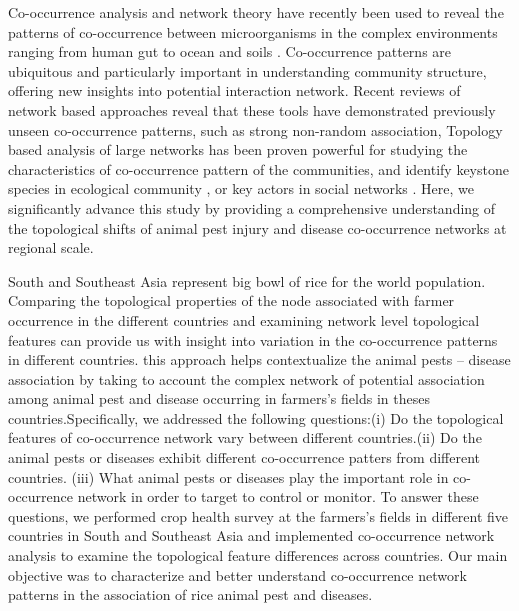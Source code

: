 Co-occurrence analysis and network theory have recently been used to reveal the patterns of co-occurrence between microorganisms in the complex environments ranging from human gut to ocean and soils \citep{Faust_2012_Microbial_co, Ma_2016_Geographic}. Co-occurrence patterns are ubiquitous and particularly important in understanding community structure, offering new insights into potential interaction network. Recent reviews of network based approaches reveal that these tools have demonstrated previously unseen co-occurrence patterns, such as strong non-random association, Topology based analysis of large networks has been proven powerful for studying the characteristics of co-occurrence pattern of the communities, and identify keystone species in ecological community \citep{Williams_2014_demonstrating, Barberan_2012_Network}, or key actors in social networks \citep{Crowston_2006_Hierarchy}. Here, we significantly advance this study by providing a comprehensive understanding of the topological shifts of animal pest injury and disease co-occurrence networks at regional scale.

South and Southeast Asia represent big bowl of rice for the world population. Comparing the topological properties of the node associated with farmer occurrence in the different countries and examining network level topological features can provide us with insight into variation in the co-occurrence patterns in different countries. this approach helps contextualize the animal pests -- disease association by taking to account the complex network of potential association among animal pest and disease occurring in farmers's fields in theses countries.Specifically, we addressed the following questions:(i) Do the topological features of co-occurrence network vary between different countries.(ii) Do the animal pests or diseases exhibit different co-occurrence patters from different countries. (iii) What animal pests or diseases play the important role in co-occurrence network in order to target to control or monitor. To answer these questions, we performed crop health survey at the farmers's fields in different five countries in South and Southeast Asia and implemented co-occurrence network analysis to examine the topological feature differences  across countries. Our main objective was to characterize and better understand co-occurrence network patterns in the association of rice animal pest and diseases.